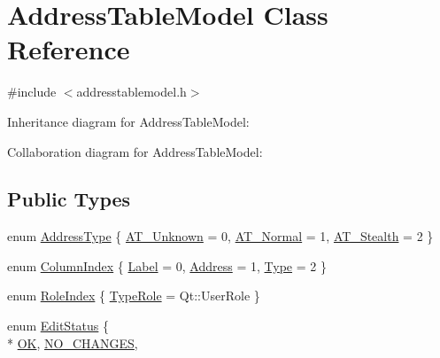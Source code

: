 \hypertarget{class_address_table_model}{}\section{Address\+Table\+Model Class Reference}
\label{class_address_table_model}


{\ttfamily \#include $<$addresstablemodel.\+h$>$}



Inheritance diagram for Address\+Table\+Model\+:


Collaboration diagram for Address\+Table\+Model\+:
\subsection*{Public Types}
\begin{DoxyCompactItemize}
\item 
enum \hyperlink{class_address_table_model_a06c1665092378384d7115b0d9e9f1846}{Address\+Type} \{ \hyperlink{class_address_table_model_a06c1665092378384d7115b0d9e9f1846a4cc0996ff8abd5d04ce657931d3e0920}{A\+T\+\_\+\+Unknown} = 0, 
\hyperlink{class_address_table_model_a06c1665092378384d7115b0d9e9f1846a49830619c8cd6b00425fc9eff0a859dd}{A\+T\+\_\+\+Normal} = 1, 
\hyperlink{class_address_table_model_a06c1665092378384d7115b0d9e9f1846a3bea71aa1b51c078f989cd9e0e27e8c5}{A\+T\+\_\+\+Stealth} = 2
 \}
\item 
enum \hyperlink{class_address_table_model_a432276ac4504e926466072561c5ddb33}{Column\+Index} \{ \hyperlink{class_address_table_model_a432276ac4504e926466072561c5ddb33aaf8f25cebb70b8a394d6c0f23c941a32}{Label} = 0, 
\hyperlink{class_address_table_model_a432276ac4504e926466072561c5ddb33a8e0abf98768fd0897965974d51a825da}{Address} = 1, 
\hyperlink{class_address_table_model_a432276ac4504e926466072561c5ddb33acfebe37f4f0d1a78d5f508f0485a85c3}{Type} = 2
 \}
\item 
enum \hyperlink{class_address_table_model_a083a01bdd3351555760f203c78c992d7}{Role\+Index} \{ \hyperlink{class_address_table_model_a083a01bdd3351555760f203c78c992d7ab65a2b297bf0f2b7e3786e2e1d2b84af}{Type\+Role} = Qt\+:\+:User\+Role
 \}
\item 
enum \hyperlink{class_address_table_model_a3d502b85fc09461e779dae4589c29956}{Edit\+Status} \{ \\*
\hyperlink{class_address_table_model_a3d502b85fc09461e779dae4589c29956af4012fcd28039528046c825a7370ad95}{O\+K}, 
\hyperlink{class_address_table_model_a3d502b85fc09461e779dae4589c29956a236bb34532175071bf068f4c614f724c}{N\+O\+\_\+\+C\+H\+A\+N\+G\+E\+S}, 

\end{DoxyCompactItemize}
